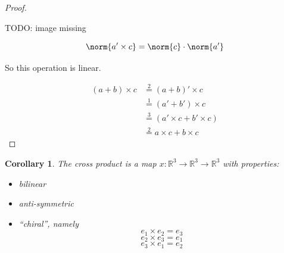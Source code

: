 \documentclass[a4paper,landscape,twocolumn]{article}
\newtheorem{cor}{Corollary}
\DeclarePairedDelimiter\norm\lVert\rVert
\begin{document}
\begin{proof}
\begin{enumerate}
      TODO: image missing

      \[ \norm{a' \times c} = \norm{c} \cdot \norm{a'} \]
  \end{enumerate}
  So this operation is linear.

  \begin{align*}
    (a + b) \times c
      &\stackrel{2}{=} (a + b)' \times c \\
      &\stackrel{1}{=} (a' + b') \times c \\
      &\stackrel{3}{=} (a' \times c + b' \times c) \\
      &\stackrel{2}{=} a \times c + b \times c
  \end{align*}
\end{proof}

\begin{cor}
  \label{cor-8.9}
  The cross product is a map $x: \mathbb R^3 \to \mathbb R^3 \to \mathbb R^3$
  with properties:
  \begin{itemize}
    \item bilinear
    \item anti-symmetric
    \item \enquote{chiral}, namely
      \[ e_1 \times e_2 = e_3 \]
      \[ e_2 \times e_3 = e_1 \]
      \[ e_3 \times e_1 = e_2 \]
  \end{itemize}
\end{cor}
\end{document}
